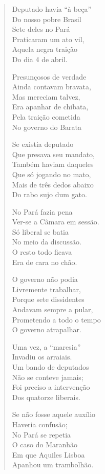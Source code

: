 \begin{verse}
Deputado havia “à beça”\\
Do nosso pobre Brasil\\
Sete deles no Pará\\
Praticaram um ato vil,\\
Aquela negra traição\\
Do dia 4 de abril.

Presunçosos de verdade\\
Ainda contavam bravata,\\
Mas mereciam talvez,\\
Era apanhar de chibata,\\
Pela traição cometida\\
No governo do Barata


Se existia deputado\\
Que presava seu mandato,\\
Também haviam daqueles\\
Que só jogando no mato,\\
Mais de três dedos abaixo\\
Do rabo sujo dum gato.

No Pará fazia pena\\
Ver-se a Câmara em sessão.\\
Só liberal se batia\\
No meio da discussão.\\
O resto todo ficava\\
Era de cara no chão.

O governo não podia\\
Livremente trabalhar,\\
Porque sete dissidentes\\
Andavam sempre a pular,\\
Prometendo a todo o tempo\\
O governo atrapalhar.

Uma vez, a “maresia”\\
Invadiu os arraiais.\\
Um bando de deputados\\
Não se conteve jamais;\\
Foi preciso a intervenção\\
Dos quatorze liberais.


Se não fosse aquele auxílio\\
Haveria confusão;\\
No Pará se repetia\\
O caso do Maranhão\\
Em que Aquiles Lisboa\\
Apanhou um trambolhão.


\end{verse}
